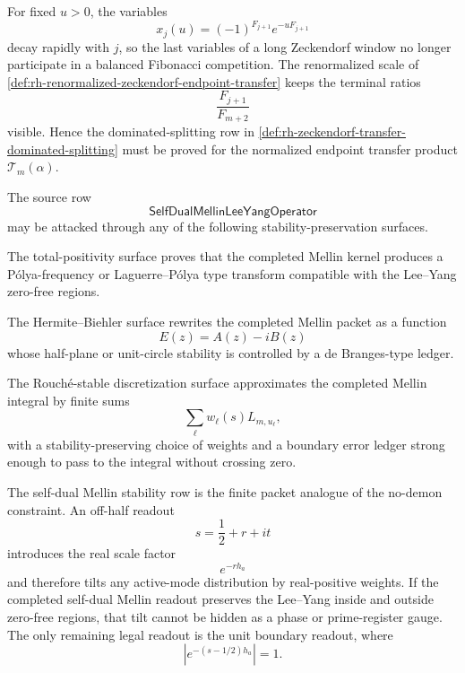 \begin{principle}
\label{prin:rh-endpoint-scaling-part-of-dominance}
For fixed $u>0$, the variables
$$
x_j(u)=(-1)^{F_{j+1}}e^{-uF_{j+1}}
$$
decay rapidly with $j$, so the last variables of a long Zeckendorf
window no longer participate in a balanced Fibonacci competition.  The
renormalized scale of
\autoref{def:rh-renormalized-zeckendorf-endpoint-transfer} keeps the
terminal ratios
$$
\frac{F_{j+1}}{F_{m+2}}
$$
visible.  Hence the dominated-splitting row in
\autoref{def:rh-zeckendorf-transfer-dominated-splitting} must be proved
for the normalized endpoint transfer product $\mathcal T_m(\alpha)$.
\end{principle}

\begin{definition}
\label{def:rh-mellin-stability-attack-surfaces}
The source row
$$
\mathsf{SelfDualMellinLeeYangOperator}
$$
may be attacked through any of the following stability-preservation
surfaces.

The total-positivity surface proves that the completed Mellin kernel
produces a P\'olya-frequency or Laguerre--P\'olya type transform
compatible with the Lee--Yang zero-free regions.

The Hermite--Biehler surface rewrites the completed Mellin packet as a
function
$$
E(z)=A(z)-iB(z)
$$
whose half-plane or unit-circle stability is controlled by a
de Branges-type ledger.

The Rouch\'e-stable discretization surface approximates the completed
Mellin integral by finite sums
$$
\sum_{\ell}w_{\ell}(s)L_{m,u_{\ell}},
$$
with a stability-preserving choice of weights and a boundary error
ledger strong enough to pass to the integral without crossing zero.
\end{definition}

\begin{principle}
\label{prin:rh-mellin-stability-no-demon-finite-form}
The self-dual Mellin stability row is the finite packet analogue of the
no-demon constraint.  An off-half readout
$$
s=\frac12+r+it
$$
introduces the real scale factor
$$
e^{-rh_a}
$$
and therefore tilts any active-mode distribution by real-positive
weights.  If the completed self-dual Mellin readout preserves the
Lee--Yang inside and outside zero-free regions, that tilt cannot be
hidden as a phase or prime-register gauge.  The only remaining legal
readout is the unit boundary readout, where
$$
|e^{-(s-1/2)h_a}|=1.
$$
\end{principle}

